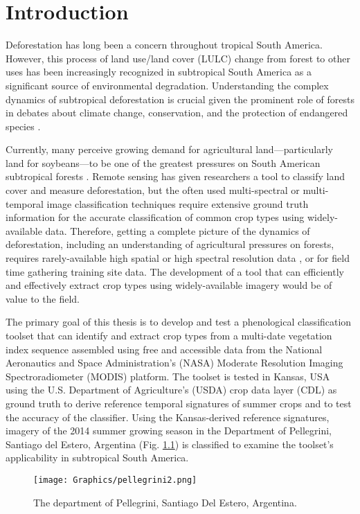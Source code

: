 \chapter{Introduction}

Deforestation has long been a concern throughout tropical South America. However, this process of land use/land cover (LULC) change from forest to other uses has been increasingly recognized in subtropical South America as a significant source of environmental degradation. Understanding the complex dynamics of subtropical deforestation is crucial given the prominent role of forests in debates about climate change, conservation, and the protection of endangered species \autocites{geist2002proximate}{zak2004do-subtropical}{bonnie2000counting}{houghton1994the-worldwide}{sala2000global}.

Currently, many perceive growing demand for agricultural land---particularly land for soybeans---to be one of the greatest pressures on South American subtropical forests \autocites{pengue2005transgenic}{grau2005agriculture}{altieri2006gm-soybean:}. Remote sensing has given researchers a tool to classify land cover and measure deforestation, but the often used multi-spectral or multi-temporal image classification techniques require extensive ground truth information for the accurate classification of common crop types using widely-available data. Therefore, getting a complete picture of the dynamics of deforestation, including an understanding of agricultural pressures on forests, requires rarely-available high spatial or high spectral resolution data \autocite{senay2000using}, or for field time gathering training site data. The development of a tool that can efficiently and effectively extract crop types using widely-available imagery would be of value to the field.

The primary goal of this thesis is to develop and test a phenological classification toolset that can identify and extract crop types from a multi-date vegetation index sequence assembled using free and accessible data from the National Aeronautics and Space Administration’s (NASA) Moderate Resolution Imaging Spectroradiometer (MODIS) platform. The toolset is tested in Kansas, USA using the U.S. Department of Agriculture's (USDA) crop data layer (CDL) as ground truth to derive reference temporal signatures of summer crops and to test the accuracy of the classifier. Using the Kansas-derived reference signatures, imagery of the 2014 summer growing season in the Department of Pellegrini, Santiago del Estero, Argentina (Fig. \ref{fig:pellegrini}) is classified to examine the toolset's applicability in subtropical South America.

\begin{figure}
  \centering
  \texttt{[image: Graphics/pellegrini2.png]}
  \caption{The department of Pellegrini, Santiago Del Estero, Argentina.}
  \label{fig:pellegrini}
\end{figure}
